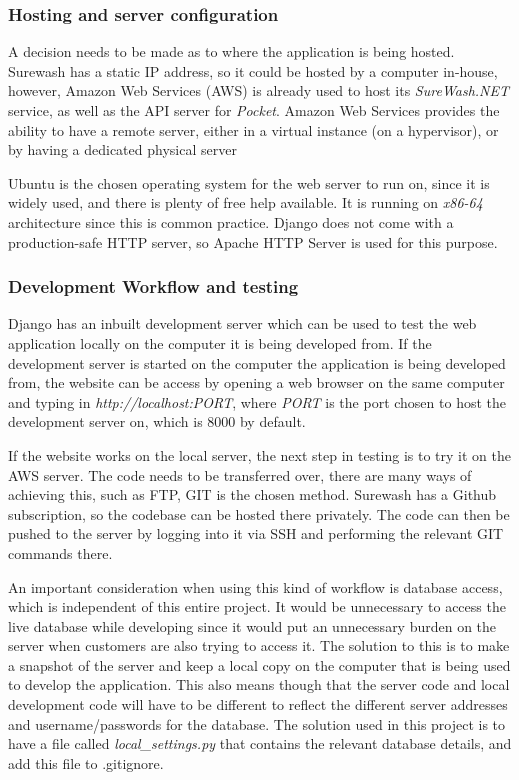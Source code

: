     \subsubsection{Hosting and server configuration}
    A decision needs to be made as to where the application is being hosted. Surewash has a static IP address, so it could be hosted by a computer in-house, however, Amazon Web Services (AWS) is already used to host its {\slshape SureWash.NET} service, as well as the API server for {\slshape Pocket}. Amazon Web Services provides the ability to have a remote server, either in a virtual instance (on a hypervisor), or by having a dedicated physical server

    Ubuntu is the chosen operating system for the web server to run on, since it is widely used, and there is plenty of free help available. It is running on {\slshape x86-64} architecture since this is common practice. Django does not come with a production-safe HTTP server, so Apache HTTP Server is used for this purpose.

    \subsubsection{Development Workflow and testing}
    Django has an inbuilt development server which can be used to test the web application locally on the computer it is being developed from. If the development server is started on the computer the application is being developed from, the website can be access by opening a web browser on the same computer and typing in {\slshape http://localhost:PORT}, where {\slshape PORT} is the port chosen to host the development server on, which is 8000 by default.

    If the website works on the local server, the next step in testing is to try it on the AWS server. The code needs to be transferred over, there are many ways of achieving this, such as FTP, GIT is the chosen method. Surewash has a Github subscription, so the codebase can be hosted there privately. The code can then be pushed to the server by logging into it via SSH and performing the relevant GIT commands there.

    An important consideration when using this kind of workflow is database access, which is independent of this entire project. It would be unnecessary to access the live database while developing since it would put an unnecessary burden on the server when customers are also trying to access it. The solution to this is to make a snapshot of the server and keep a local copy on the computer that is being used to develop the application. This also means though that the server code and local development code will have to be different to reflect the different server addresses and username/passwords for the database. The solution used in this project is to have a file called {\slshape local\_settings.py} that contains the relevant database details, and add this file to .gitignore.

